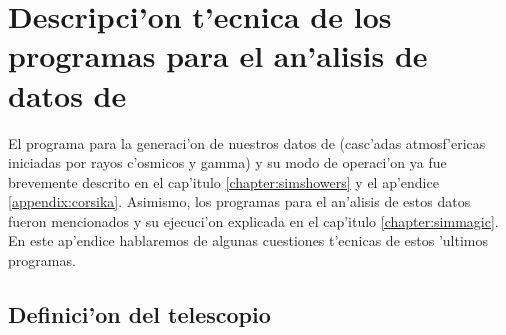 

\chapter{Descripci'on t'ecnica de los programas para el an'alisis de 
  datos de \MC}
\label{appendix:programs}

El programa para la generaci'on de nuestros datos de \MC (casc'adas
atmosf'ericas iniciadas por rayos c'osmicos y gamma) y su modo de
operaci'on ya fue brevemente descrito en el cap'itulo
\ref{chapter:simshowers} y el ap'endice 
\ref{appendix:corsika}. Asimismo, los programas para el an'alisis de
estos datos fueron mencionados y su ejecuci'on explicada en el
cap'itulo \ref{chapter:simmagic}. En este ap'endice hablaremos de
algunas cuestiones t'ecnicas de estos 'ultimos programas.

\afterpage{\clearpage}


\section{Definici'on del telescopio}
\label{sec:ctdef}

